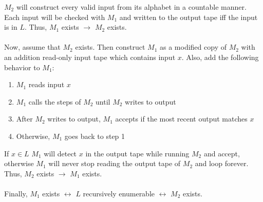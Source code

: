 \documentclass[letterpaper,notitlepage,twoside]{article}
\begin{document}
$M_2$ will construct every valid input from its alphabet in a countable manner. Each input will be checked with $M_1$ and written to the output tape iff the input is in $L$. Thus, $M_1$ exists $\rightarrow$ $M_2$ exists.
\\
\\
Now, assume that $M_2$ exists. Then construct $M_1$ as a modified copy of $M_2$ with an addition read-only input tape which contains input $x$. Also, add the following behavior to $M_1$:
\begin{enumerate}
\item $M_1$ reads input $x$
\item $M_1$ calls the steps of $M_2$ until $M_2$ writes to output
\item After $M_2$ writes to output, $M_1$ accepts if the most recent output matches $x$
\item Otherwise, $M_1$ goes back to step 1
\end{enumerate}
If $x \in L$ $M_1$ will detect $x$ in the output tape while running $M_2$ and accept, otherwise $M_1$ will never stop reading the output tape of $M_2$ and loop forever. Thus, $M_2$ exists $\rightarrow$ $M_1$ exists.
\\
\\
Finally, $M_1$ exists $\leftrightarrow$ $L$ recursively enumerable $\leftrightarrow$ $M_2$ exists.
\end{document}
